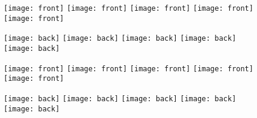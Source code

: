 \documentclass[a4paper,10pt,twocolumn]{jarticle}
\begin{document}
	
\begin{figure}[t!]
	\centering
	\texttt{[image: front]}
	\texttt{[image: front]}
	\texttt{[image: front]}
	\texttt{[image: front]}
	\texttt{[image: front]}
\end{figure}
\begin{figure}[t!]
        \centering
        \texttt{[image: back]}
        \texttt{[image: back]}
        \texttt{[image: back]}
        \texttt{[image: back]}
        \texttt{[image: back]}
\end{figure}
\begin{figure}[t!]
	\centering
	\texttt{[image: front]}
	\texttt{[image: front]}
	\texttt{[image: front]}
	\texttt{[image: front]}
	\texttt{[image: front]}
\end{figure}
\begin{figure}[t!]
	\centering
	\texttt{[image: back]}
	\texttt{[image: back]}
	\texttt{[image: back]}
	\texttt{[image: back]}
	\texttt{[image: back]}
\end{figure}
\end{document}

